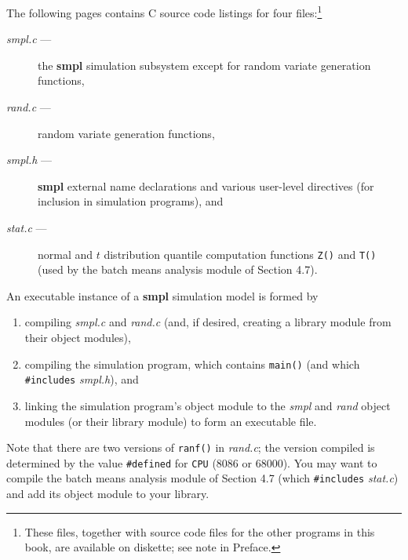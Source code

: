 \thispagestyle{empty}
\vspace*{0.8in}
\vspace{0.25in}
\label{chap:appendix-source}

The following pages contains C source code listings for four files:\footnote{These
files, together with source code files for the other programs in this book, are
available on diskette; see note in Preface.}
\begin{description}
\item[\textit{smpl.c} ---] the \textbf{smpl} simulation subsystem except for random variate generation functions,
\item[\textit{rand.c} ---] random variate generation functions,
\item[\textit{smpl.h} ---] \textbf{smpl} external name declarations and various user-level directives (for inclusion in simulation programs), and
\item[\textit{stat.c} ---] normal and $t$ distribution quantile computation functions \texttt{Z()} and \texttt{T()} (used by the batch means analysis module of Section 4.7).
\end{description}

An executable instance of a \textbf{smpl} simulation model is formed by
\begin{enumerate}
\item compiling \textit{smpl.c} and \textit{rand.c} (and, if desired, creating a library module from their object modules),
\item compiling the simulation program, which contains \texttt{main()} (and which \texttt{\#includes} \textit{smpl.h}), and
\item linking the simulation program's object module to the \textit{smpl} and \textit{rand} object modules (or their library module) to form an executable file.
\end{enumerate}
Note that there are two versions of \texttt{ranf()} in \textit{rand.c}; the version compiled is determined by the value \texttt{\#defined} for \texttt{CPU} (8086 or 68000). You may want to compile the batch means analysis module of Section 4.7 (which \texttt{\#includes} \textit{stat.c}) and add its object module to your library.


